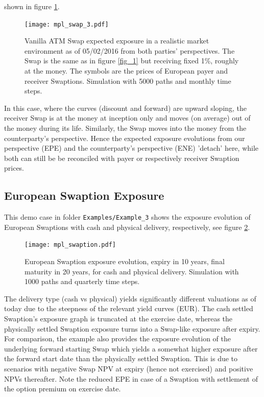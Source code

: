 \documentclass[12pt, a4paper]{article}
\begin{document}
shown in figure \ref{fig_2}.
\begin{figure}[h!]
\begin{center}
\texttt{[image: mpl\_swap\_3.pdf]}
\end{center}
\caption{Vanilla ATM Swap expected exposure in a realistic market environment as of 05/02/2016 from both parties'
  perspectives. The Swap is the same as in figure \ref{fig_1} but receiving fixed 1\%, roughly at the money. The symbols
  are the prices of European payer and receiver Swaptions. Simulation with 5000 paths and monthly time steps.}
\label{fig_2}
\end{figure}
In this case, where the curves (discount and forward) are upward sloping, the receiver Swap is at the money at inception
only and moves (on average) out of the money during its life. Similarly, the Swap moves into the money from the
counterparty's perspective. Hence the expected exposure evolutions from our perspective (EPE) and the counterparty's
perspective (ENE) 'detach' here, while both can still be be reconciled with payer or respectively receiver Swaption
prices.

\subsection{European Swaption Exposure}\label{sec:european_swaption}

This demo case in folder {\tt Examples/Example\_3} shows the exposure evolution of European Swaptions with cash and
physical delivery, respectively, see figure \ref{fig_3}.
\begin{figure}[h!]
\begin{center}
\texttt{[image: mpl\_swaption.pdf]}
\end{center}
\caption{European Swaption exposure evolution, expiry in 10 years, final maturity in 20 years, for cash and physical
  delivery. Simulation with 1000 paths and quarterly time steps. }
\label{fig_3}
\end{figure}
The delivery type (cash vs physical) yields significantly different valuations as of today due to the steepness of the
relevant yield curves (EUR). The cash settled Swaption's exposure graph is truncated at the exercise date, whereas the
physically settled Swaption exposure turns into a Swap-like exposure after expiry. For comparison, the example also
provides the exposure evolution of the underlying forward starting Swap which yields a somewhat higher exposure after
the forward start date than the physically settled Swaption. This is due to scenarios with negative Swap NPV at expiry
(hence not exercised) and positive NPVs thereafter. Note the reduced EPE in case of a Swaption with settlement of the option premium on exercise date.
\end{document}
